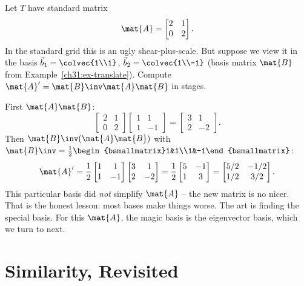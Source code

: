\begin{example}
\label{ch31:ex-shear-diag}
Let $T$ have standard matrix
\[
  \mat{A} = \begin{bmatrix} 2 & 1\\ 0 & 2\end{bmatrix}.
\]
In the standard grid this is an ugly shear-plus-scale. But suppose we view it in
the basis $\vec{b}_1=\colvec{1\\1}$, $\vec{b}_2=\colvec{1\\-1}$ (basis matrix
$\mat{B}$ from Example~\ref{ch31:ex-translate}). Compute
$\mat{A}'=\mat{B}\inv\mat{A}\mat{B}$ in stages.

First $\mat{A}\mat{B}$:
\[
  \begin{bmatrix} 2 & 1\\ 0 & 2\end{bmatrix}\begin{bmatrix} 1 & 1\\ 1 & -1\end{bmatrix}
  = \begin{bmatrix} 3 & 1\\ 2 & -2\end{bmatrix}.
\]
Then $\mat{B}\inv(\mat{A}\mat{B})$ with $\mat{B}\inv=\tfrac12\begin{bsmallmatrix}1&1\\1&-1\end{bsmallmatrix}$:
\[
  \mat{A}' = \frac12\begin{bmatrix} 1 & 1\\ 1 & -1\end{bmatrix}\begin{bmatrix} 3 & 1\\ 2 & -2\end{bmatrix}
  = \frac12\begin{bmatrix} 5 & -1\\ 1 & 3\end{bmatrix}
  = \begin{bmatrix} 5/2 & -1/2\\ 1/2 & 3/2\end{bmatrix}.
\]
This particular basis did \emph{not} simplify $\mat{A}$ -- the new matrix is no
nicer. That is the honest lesson: most bases make things worse. The art is finding
the special basis. For this $\mat{A}$, the magic basis is the eigenvector basis,
which we turn to next.
\end{example}

\section{Similarity, Revisited}
\label{ch31:similarity}

